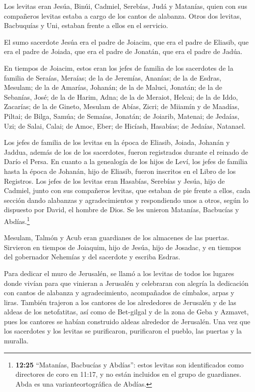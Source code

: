  Los levitas eran Jesúa, Binúi, Cadmiel, Serebías, Judá y
Matanías, quien con sus compañeros levitas estaba a cargo de los cantos
de alabanza.  Otros dos levitas, Bacbuquías y Uni, estaban
frente a ellos en el servicio.

 El sumo sacerdote Jesúa era el padre de Joiacim, que era
el padre de Eliasib, que era el padre de Joiada,  que era
el padre de Jonatán, que era el padre de Jadúa.

 En tiempos de Joiacim, estos eran los jefes de familia de
los sacerdotes de la familia de Seraías, Meraías; de la de Jeremías,
Ananías;  de la de Esdras, Mesulam; de la de Amarías,
Johanán;  de la de Maluci, Jonatán; de la de Sebanías,
José;  de la de Harim, Adna; de la de Meraiot, Helcai;
 de la de Iddo, Zacarías; de la de Gineto, Mesulam
 de Abías, Zicri; de Miiamín y de Maadías, Piltai;
 de Bilga, Samúa; de Semaías, Jonatán;  de
Joiarib, Matenai; de Jedaías, Uzi;  de Salai, Calai; de
Amoc, Eber;  de Hicíash, Hasabías; de Jedaías, Natanael.

 Los jefes de familia de los levitas en la época de
Eliasib, Joiada, Johanán y Jaddua, además de los de los sacerdotes,
fueron registrados durante el reinado de Darío el Persa. 
En cuanto a la genealogía de los hijos de Leví, los jefes de familia
hasta la época de Johanán, hijo de Eliasib, fueron inscritos en el Libro
de los Registros.  Los jefes de los levitas eran Hasabías,
Serebías y Jesúa, hijo de Cadmiel, junto con sus compañeros levitas, que
estaban de pie frente a ellos, cada sección dando alabanzas y
agradecimientos y respondiendo unos a otros, según lo dispuesto por
David, el hombre de Dios.  Se les unieron Matanías,
Bacbucías y Abdías.\footnote{\textbf{12:25} ``Matanías, Bacbucías y
  Abdías'': estos levitas son identificados como directores de coro en
  11:17, y no están incluidos en el grupo de guardianes. Abda es una
  varianteortográfica de Abdías.}

Mesulam, Talmón y Acub eran guardianes de los almacenes de las puertas.
 Sirvieron en tiempos de Joiaquim, hijo de Jesúa, hijo de
Josadac, y en tiempos del gobernador Nehemías y del sacerdote y escriba
Esdras.

 Para dedicar el muro de Jerusalén, se llamó a los levitas
de todos los lugares donde vivían para que vinieran a Jerusalén y
celebraran con alegría la dedicación con cantos de alabanza y
agradecimiento, acompañados de címbalos, arpas y liras. 
También trajeron a los cantores de los alrededores de Jerusalén y de las
aldeas de los netofatitas,  así como de Bet-gilgal y de la
zona de Geba y Azmavet, pues los cantores se habían construido aldeas
alrededor de Jerusalén.  Una vez que los sacerdotes y los
levitas se purificaron, purificaron el pueblo, las puertas y la muralla.

